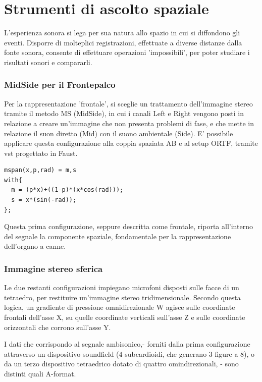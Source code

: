 \section*{Strumenti di ascolto spaziale}
L'esperienza sonora si lega per sua natura allo spazio in cui si diffondono 
gli eventi. Disporre di molteplici registrazioni, effettuate a diverse distanze
dalla fonte sonora, consente di effettuare operazioni 'impossibili', per poter 
studiare i risultati sonori e compararli.



\subsubsection*{MidSide per il Frontepalco}
Per la rappresentazione 'frontale', si sceglie un trattamento dell'immagine 
stereo tramite il metodo MS (MidSide), in cui i canali Left e Right vengono 
posti in relazione a creare un'immagine che non presenta problemi di fase,
e che mette in relazione il suon diretto (Mid) con il suono ambientale (Side).
E' possibile applicare questa configurazione alla coppia spaziata AB e al setup 
ORTF, tramite vst progettato in Faust.

\begin{lstlisting}
mspan(x,p,rad) = m,s
with{
  m = (p*x)+((1-p)*(x*cos(rad)));
  s = x*(sin(-rad));
};
\end{lstlisting}



Questa prima configurazione, seppure descritta come frontale, 
riporta all'interno del segnale la componente spaziale, fondamentale per la 
rappresentazione dell'organo a canne.


\subsubsection*{Immagine stereo sferica}

Le due restanti configurazioni impiegano microfoni disposti sulle facce di un 
tetraedro, per restituire un'immagine stereo tridimensionale.
Secondo questa logica, un gradiente di pressione omnidirezionale W agisce 
sulle coordinate frontali dell'asse X, su quelle coordinate verticali sull'asse Z 
e sulle coordinate orizzontali che corrono sull'asse Y.

I dati che corrispondo al segnale ambisonico,- forniti dalla prima configurazione 
attraverso un dispositivo soundfield (4 subcardioidi, che generano 3 figure a 8), 
o da un terzo dispositivo tetraedrico dotato di quattro omindirezionali, - sono 
distinti quali A-format.

